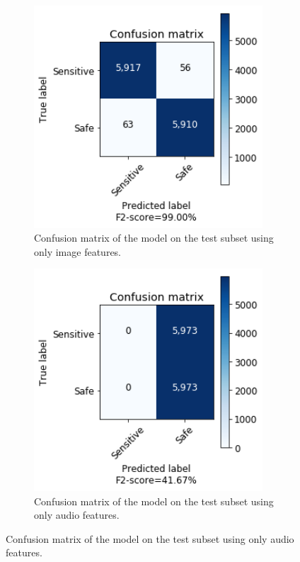 \begin{figure}[!ht]
    \centering
    \begin{subfigure}[b]{0.49\textwidth}
        \includegraphics[width=0.94\textwidth]{img/results/MLP-TEST-IMAGE-ONLY.png}
        \caption{Confusion matrix of the model on the test subset using only image features.}
        \label{fig:cf-test-image}
    \end{subfigure}
    \begin{subfigure}[b]{0.49\textwidth}
        \includegraphics[width=0.94\textwidth]{img/results/MLP-TEST-AUDIO-ONLY.png}
        \caption{Confusion matrix of the model on the test subset using only audio features.}
        \label{fig:cf-test-audio}
    \end{subfigure}
\end{figure}

